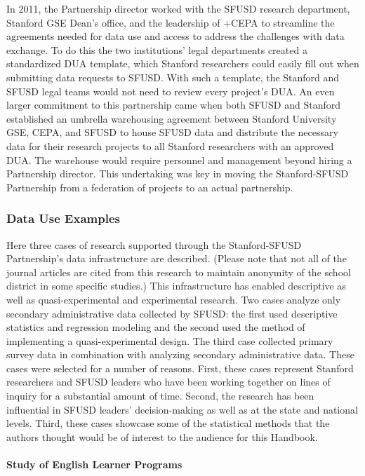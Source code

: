 \documentclass[
]{WileySix}
\begin{document}
In 2011, the Partnership director worked with the SFUSD research department, Stanford GSE Dean's office, and the leadership of +CEPA\textbar{} to streamline the agreements needed for data use and access to address the challenges with data exchange. To do this the two institutions' legal departments created a standardized DUA template, which Stanford researchers could easily fill out when submitting data requests to SFUSD. With such a template, the Stanford and SFUSD legal teams would not need to review every project's DUA. An even larger commitment to this partnership came when both SFUSD and Stanford established an umbrella warehousing agreement between Stanford University GSE, CEPA, and SFUSD to house SFUSD data and distribute the necessary data for their research projects to all Stanford researchers with an approved DUA. The warehouse would require personnel and management beyond hiring a Partnership director. This undertaking was key in moving the Stanford-SFUSD Partnership from a federation of projects to an actual partnership.

\hypertarget{data-use-examples-5}{%
\subsubsection{Data Use Examples}\label{data-use-examples-5}}

Here three cases of research supported through the Stanford-SFUSD Partnership's data infrastructure are described. (Please note that not all of the journal articles are cited from this research to maintain anonymity of the school district in some specific studies.) This infrastructure has enabled descriptive as well as quasi-experimental and experimental research. Two cases analyze only secondary administrative data collected by SFUSD: the first used descriptive statistics and regression modeling and the second used the method of implementing a quasi-experimental design. The third case collected primary survey data in combination with analyzing secondary administrative data. These cases were selected for a number of reasons. First, these cases represent Stanford researchers and SFUSD leaders who have been working together on lines of inquiry for a substantial amount of time. Second, the research has been influential in SFUSD leaders' decision-making as well as at the state and national levels. Third, these cases showcase some of the statistical methods that the authors thought would be of interest to the audience for this Handbook.

\hypertarget{study-of-english-learner-programs}{%
\paragraph{Study of English Learner Programs}\label{study-of-english-learner-programs}}
\end{document}
